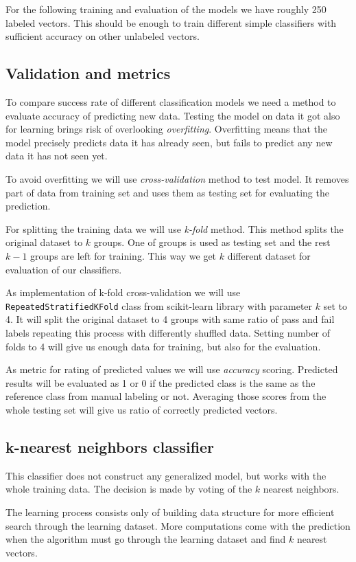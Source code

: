 For the following training and evaluation of the models we have roughly 250
labeled vectors. This should be enough to train different simple classifiers with
sufficient accuracy on other unlabeled vectors.

\subsection{Validation and metrics}
To compare success rate of different classification models we need a method to evaluate
accuracy of predicting new data. Testing the model on data it got also for
learning brings risk of overlooking \emph{overfitting}. Overfitting means that the model
precisely predicts data it has already seen, but fails to predict any new data
it has not seen yet.

To avoid overfitting we will use \emph{cross-validation} method to test model.
It removes part of data from training set and uses them as testing set for
evaluating the prediction.

For splitting the training data we will use \emph{k-fold} method. This method
splits the original dataset to $k$ groups. One of groups is used as testing set and
the rest $k - 1$ groups are left for training. This way we get $k$ different
dataset for evaluation of our classifiers.

As implementation of k-fold cross-validation we will use
\texttt{RepeatedStratifiedKFold} class from scikit-learn library with parameter
$k$ set to 4. It will split the original dataset to 4 groups with same ratio of
pass and fail labels repeating this process with differently shuffled data.
Setting number of folds to 4 will give us enough data for training, but also for
the evaluation.

As metric for rating of predicted values we will use \emph{accuracy} scoring.
Predicted results will be evaluated as 1 or 0 if the predicted class is the same as the reference
class from manual labeling or not. Averaging those scores from the whole testing
set will give us ratio of correctly predicted vectors.

\subsection{k-nearest neighbors classifier}
This classifier does not construct any generalized model, but works with the
whole training data. The decision is made by voting of the $k$ nearest
neighbors.

The learning process consists only of building data structure for more efficient
search through the learning dataset. More computations come with the prediction
when the algorithm must go through the learning dataset and find $k$ nearest
vectors.

